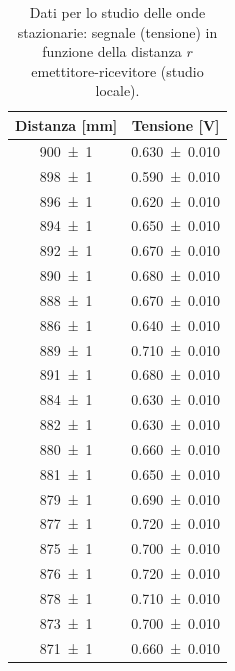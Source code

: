 \documentclass[a4paper]{article}
\begin{document}
\begin{table}[htbp]
\centering
\caption{Dati per lo studio delle onde stazionarie: segnale (tensione) in funzione della distanza $r$ emettitore-ricevitore (studio locale).}
\label{tab:dati_ampgeom_ondestazionarie}
\begin{tabular}{|c|c|}
\hline
Distanza [\si{\milli\metre}] & Tensione [\si{\volt}] \\\hline\hline
\SI{900 \pm 1}{} & \SI{0.630 \pm 0.010}{} \\
\SI{898 \pm 1}{} & \SI{0.590 \pm 0.010}{} \\
\SI{896 \pm 1}{} & \SI{0.620 \pm 0.010}{} \\
\SI{894 \pm 1}{} & \SI{0.650 \pm 0.010}{} \\
\SI{892 \pm 1}{} & \SI{0.670 \pm 0.010}{} \\
\SI{890 \pm 1}{} & \SI{0.680 \pm 0.010}{} \\
\SI{888 \pm 1}{} & \SI{0.670 \pm 0.010}{} \\
\SI{886 \pm 1}{} & \SI{0.640 \pm 0.010}{} \\
\SI{889 \pm 1}{} & \SI{0.710 \pm 0.010}{} \\
\SI{891 \pm 1}{} & \SI{0.680 \pm 0.010}{} \\
\SI{884 \pm 1}{} & \SI{0.630 \pm 0.010}{} \\
\SI{882 \pm 1}{} & \SI{0.630 \pm 0.010}{} \\
\SI{880 \pm 1}{} & \SI{0.660 \pm 0.010}{} \\
\SI{881 \pm 1}{} & \SI{0.650 \pm 0.010}{} \\
\SI{879 \pm 1}{} & \SI{0.690 \pm 0.010}{} \\
\SI{877 \pm 1}{} & \SI{0.720 \pm 0.010}{} \\
\SI{875 \pm 1}{} & \SI{0.700 \pm 0.010}{} \\
\SI{876 \pm 1}{} & \SI{0.720 \pm 0.010}{} \\
\SI{878 \pm 1}{} & \SI{0.710 \pm 0.010}{} \\
\SI{873 \pm 1}{} & \SI{0.700 \pm 0.010}{} \\
\SI{871 \pm 1}{} & \SI{0.660 \pm 0.010}{} \\
\hline
\end{tabular}
\end{table}
\end{document}
